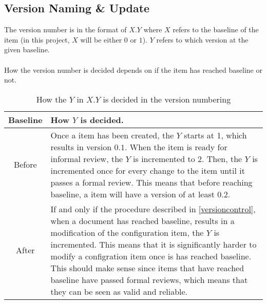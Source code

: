 \documentclass{article}
\begin{document}
    \subsection{Version Naming \& Update}
        The version number is in the format of $X.Y$ where $X$ refers to the baseline
        of the item (in this project, $X$ will be either $0$ or $1$). $Y$ refers
        to which version at the given baseline.
        \\ \\
        How the version number is decided depends on if the item has reached baseline or not.
        \begin{table}[h]
            \centering
            \begin{tabular}{|c|l|}
                \hline
                    \textbf{Baseline} & \textbf{How $Y$ is decided.} \\
                \hline
                    Before & \parbox{.8\textwidth} { \vspace{.2cm}
                            Once a item has been created, the $Y$
                            starts at 1, which results in version $0.1$. When the item is ready for informal
                            review, the $Y$ is incremented to 2. Then, the $Y$ is incremented once for every change to the item until it passes a formal review. This means that before reaching baseline, a item will have a version of at least $0.2$.
                            \vspace{.2cm} } \\
                \hline
                    After & \parbox{.8\textwidth} { \vspace{.2cm}
                        If and only if the procedure described in \ref{versioncontrol}, when a document has reached baseline, results in a modification of the
                        configuration item, the $Y$ is incremented. This means that
                        it is significantly harder to modify a configration item once
                        is has reached baseline. This should make sense since items
                        that have reached baseline have passed formal reviews, which means
                        that they can be seen as valid and reliable.
                        \vspace{.2cm}} \\
                \hline
            \end{tabular}
            \caption{How the $Y$ in $X.Y$ is decided in the version numbering}
            \label{versionnumber}
        \end{table}
\end{document}

